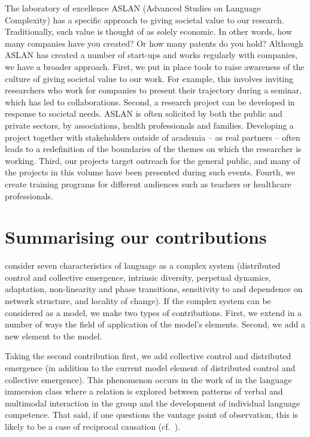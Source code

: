 \documentclass[output=paper]{langscibook}
\begin{document}
The laboratory of excellence ASLAN (Advanced Studies on Language Complexity) has a specific approach to giving societal value to our research. Traditionally, such value is thought of as solely economic. In other words, how many companies have you created? Or how many patents do you hold? Although ASLAN has created a number of start-ups and works regularly with companies, we have a broader approach. First, we put in place tools to raise awareness of the culture of giving societal value to our work. For example, this involves inviting researchers who work for companies to present their trajectory during a seminar, which has led to collaborations.  Second, a research project can be developed in response to societal needs. ASLAN is often solicited by both the public and private sectors, by associations, health professionals and families. Developing a project together with stakeholders outside of academia -- as real partners -- often leads to a redefinition of the boundaries of the themes on which the researcher is working. Third, our projects target outreach for the general public, and many of the projects in this volume have been presented during such events. Fourth, we create training programs for different audiences such as teachers or healthcare professionals.

\section{Summarising our contributions}

\citet{BecknerEtAl2009} consider seven characteristics of language as a complex system (distributed control and collective emergence, intrinsic diversity, perpetual dynamics, adaptation, non-linearity and phase transitions, sensitivity to and dependence on network structure, and locality of change). If the complex system can be considered as a model, we make two types of contributions. First, we extend in a number of ways the field of application of the model’s elements. Second, we add a new element to the model.

Taking the second contribution first, we add collective control and distributed emergence (in addition to the current model element of distributed control and collective emergence). This phenomenon occurs in the work of  in the language immersion class where a relation is explored between patterns of verbal and multimodal interaction in the group and the development of individual language competence. That said, if one questions the vantage point of observation, this is likely to be a case of reciprocal causation (cf.~\citealt{Bandura1986}).
\end{document}
